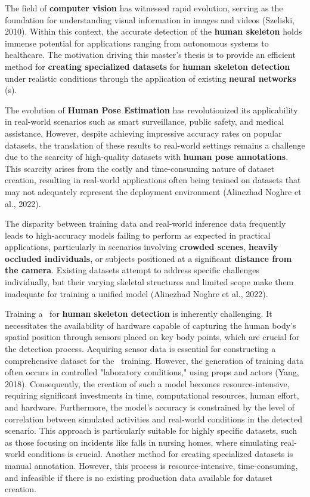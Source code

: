 

The field of {\bf computer vision} has witnessed rapid evolution, serving as the foundation for understanding visual information in images and videos (\scc Szeliski, 2010). Within this context, the accurate detection of the {\bf human skeleton} holds immense potential for applications ranging from autonomous systems to healthcare. The motivation driving this master's thesis is to provide an efficient method for {\bf creating specialized datasets} for {\bf human skeleton detection} under realistic conditions through the application of existing {\bf neural networks} (\NN\-s).

The evolution of {\bf Human Pose Estimation} has revolutionized its applicability in real-world scenarios such as smart surveillance, public safety, and medical assistance. However, despite achieving impressive accuracy rates on popular datasets, the translation of these results to real-world settings remains a challenge due to the scarcity of high-quality datasets with {\bf human pose annotations}. This scarcity arises from the costly and time-consuming nature of dataset creation, resulting in real-world applications often being trained on datasets that may not adequately represent the deployment environment (\scc Alinezhad Noghre et al., 2022).

The disparity between training data and real-world inference data frequently leads to high-accuracy models failing to perform as expected in practical applications, particularly in scenarios involving {\bf crowded scenes}, {\bf heavily occluded individuals}, or subjects positioned at a significant {\bf distance from the camera}. Existing datasets attempt to address specific challenges individually, but their varying skeletal structures and limited scope make them inadequate for training a unified model (\scc Alinezhad Noghre et al., 2022).

Training a \NN\ for {\bf human skeleton detection} is inherently challenging. It necessitates the availability of hardware capable of capturing the human body's spatial position through sensors placed on key body points, which are crucial for the detection process. Acquiring sensor data is essential for constructing a comprehensive dataset for the \NN\ training. However, the generation of training data often occurs in controlled "laboratory conditions," using props and actors (\scc Yang, 2018). Consequently, the creation of such a model becomes resource-intensive, requiring significant investments in time, computational resources, human effort, and hardware. Furthermore, the model's accuracy is constrained by the level of correlation between simulated activities and real-world conditions in the detected scenario. This approach is particularly suitable for highly specific datasets, such as those focusing on incidents like falls in nursing homes, where simulating real-world conditions is crucial. Another method for creating specialized datasets is manual annotation. However, this process is resource-intensive, time-consuming, and infeasible if there is no existing production data available for dataset creation.

